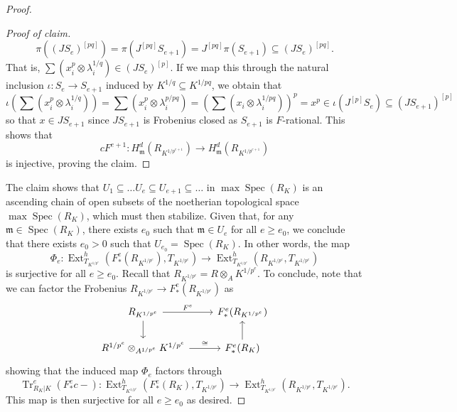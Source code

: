 \documentclass[reqno,11pt]{amsart}
\numberwithin{equation}{section}
\theoremstyle{definition}
\theoremstyle{definition}
\theoremstyle{definition}
\theoremstyle{remark}
\newcommand{\Spec}{\operatorname{Spec}}
\newcommand{\Ext}{\operatorname{Ext}}
\newcommand{\Tr}{\operatorname{Tr}}
\newcommand{\fm}{\mathfrak{m}}
\begin{document}
\begin{proof}
\begin{proof}[Proof of claim]
\[\pi((JS_e)^{[pq]}) = \pi(J^{[pq]}S_{e+1})= J^{[pq]}\pi(S_{e+1}) \subseteq (JS_e)^{[pq]}.
\]
That is, $\sum (x_i^p \otimes \lambda_i^{1/q}) \in (JS_e)^{[p]}$. If we map this through the natural inclusion $\iota\colon  S_e \to S_{e+1}$ induced by $K^{1/q} \subseteq K^{1/pq}$, we obtain that $$\iota(\sum (x_i^p \otimes \lambda_i^{1/q})) = \sum (x_i^p \otimes \lambda_i^{p/pq}) = (\sum(x_i\otimes \lambda_i^{1/pq}))^p =x^p \in \iota(J^{[p]}S_e) \subseteq (JS_{e+1})^{[p]}$$ so that $x \in JS_{e+1}$ since $JS_{e+1}$ is Frobenius closed as $S_{e+1}$ is $F$-rational. This shows that $$cF^{e+1}\colon H^d_{\fm}(R_{K^{1/p^{e+1}}}) \to H^d_{\fm}(R_{K^{1/p^{e+1}}})$$ is injective, proving the claim.
\end{proof}



The claim shows that $U_1 \subseteq \ldots U_e \subseteq U_{e+1} \subseteq \ldots$ in  $\max\Spec(R_K)$ is an ascending chain of open subsets of the noetherian topological space $\max\Spec(R_K)$, which must then stabilize. Given that, for any $\fm \in \Spec(R_K)$, there exists $e_0$ such that $\fm \in U_e$ for all $e \geq e_0$, we conclude that there exists $e_0>0$ such that $U_{e_0} = \Spec(R_K)$. In other words, the map
$$\Phi_e\colon \Ext^h_{T_{K^{1/p^e}}}(F^e_*(R_{K^{1/p^e}}),T_{K^{1/p^e}}) \to \Ext^h_{T_{K^{1/p^e}}}(R_{K^{1/p^e}},T_{K^{1/p^e}})$$ is surjective for all $e \geq e_0$. Recall that $R_{K^{1/p^e}} = R\otimes_A K^{1/p^e}$. To conclude, note that we can factor the Frobenius $R_{K^{1/p^e}}\to F^e_*(R_{K^{1/p^e}})$ as
\begin{equation*}
    \begin{tikzcd}
        R_{K^{1/p^e}}\arrow[r,"F^e"]\arrow[d] & F^e_*(R_{K^{1/p^e}})\\
        R^{1/p^e}\otimes_{A^{1/p^e}} K^{1/p^e}\arrow[r,"\cong"] & F^e_*(R_K)\arrow[u]
    \end{tikzcd}
\end{equation*}
showing that the induced map $\Phi_e$ factors through $$\Tr^e_{R_K|K}(F^e_*c -)\colon  \Ext^h_{T_{K^{1/p^e}}}(F^e_*(R_K),T_{K^{1/p^e}}) \to \Ext^h_{T_{K^{1/p^e}}}(R_{K^{1/p^e}},T_{K^{1/p^e}}).$$ This map is then surjective for all $e \geq e_0$ as desired.
\end{proof}
\end{document}

